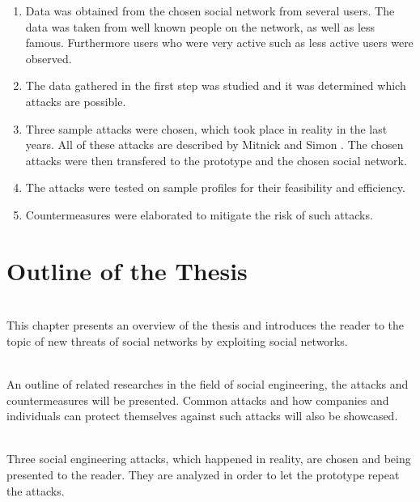 \begin{enumerate}

\item Data was obtained from the chosen social network from several users. The
data was taken from well known people on the network, as well as less famous.
Furthermore users who were very active such as less active users were
observed.

\item The data gathered in the first step was studied and it was determined
which attacks are possible. 

\item Three sample attacks were chosen, which took place in reality in the last
years. All of these attacks are described by Mitnick and Simon
\cite{mitnick2003}. The chosen attacks were then transfered to the prototype
and the chosen social network.

\item The attacks were tested on sample profiles for their feasibility and
efficiency.

\item Countermeasures were elaborated to mitigate the risk of such attacks.

\end{enumerate}

\newpage
\section{Outline of the Thesis}

\let\oldchapterautorefname \chapterautorefname
\def\chapterautorefname{Chapter}

\vspace{0.5em}\\
\noindent This chapter presents an overview of the thesis and introduces the
reader to the topic of new threats of social networks by exploiting social
networks.

\vspace{0.5em}\\
\noindent An outline of related researches in the field of social
engineering, the attacks and countermeasures will be presented. Common attacks
and how companies and individuals can protect themselves against such attacks
will also be showcased.

\vspace{0.5em}\\
\noindent Three social engineering attacks, which happened in reality, are chosen
and being presented to the reader. They are analyzed in order to let the
prototype repeat the attacks.

